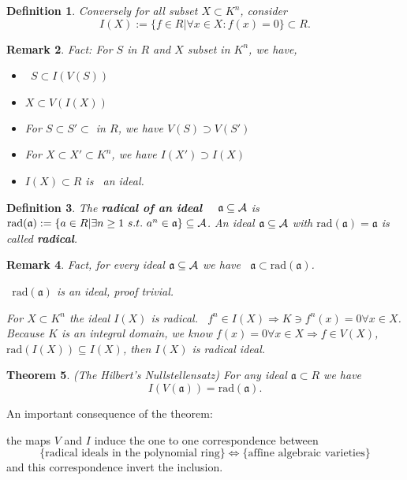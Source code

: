 \documentclass[11pt]{article}
\newtheorem{thm}{Theorem}[section]
\newtheorem{dfn}[thm]{Definition}
\newtheorem{rmk}[thm]{Remark}
\newcommand{\sca}{{\mathfrak a}}
\newcommand{\cala}{{\cal A}}
\newcommand{\Lrta}{\Longrightarrow}
\begin{document}
\begin{dfn}
Conversely for all subset $X \subset K^n$, consider 
          $$ I(X):=\{f\in R | \forall x\in X: f(x)=0\}\subset R.$$
\end{dfn}
\begin{rmk}
Fact: For $S$ in $R$ and $X$ subset in $K^n$, we have, 
\begin{itemize}
\item
 $S\subset I(V(S))$
\item
 $X \subset V(I(X))$
\item
 For $S\subset S' \subset$ in $R$, we have $V(S)\supset V(S')$
\item
 For $X \subset X'\subset K^n$, we have $ I(X')\supset I(X)$
\item
 $I(X) \subset R$ is  an ideal.
\end{itemize}
\end{rmk}

\begin{dfn}
The \textbf{radical of an ideal}   $\sca\subseteq \cala$ is 
 $\text{rad}(\sca):=\{a\in R| \exists n\geq1\  s.t.\  a^n \in \sca\} \subseteq \cala$.
An ideal $\sca \subseteq \cala$ with $\text{rad}(\sca)=\sca$ is  called \textbf{radical}.
\end{dfn}

\begin{rmk}
Fact, 
for every ideal $\sca \subseteq \cala$ we have  $\sca\subset \text{rad}(\sca)$.

 $\text{rad}(\sca)$ is an ideal, proof trivial.

For $X\subset K^n$ the ideal $I(X)$ is radical. 
$f^n\in I(X)\Lrta K\ni f^n(x)=0\forall x\in X$. Because $K$ is an integral domain, we know $f(x)=0\forall x\in X\Lrta f\in V(X)$, $\text{rad}(I(X))\subseteq I(X)$, then $I(X)$ is radical ideal.
\end{rmk}

\begin{thm}
(The Hilbert's Nullstellensatz)
For any ideal $\sca \subset R $ we have
$$I(V(\sca))=\text{rad}(\sca).$$
\end{thm}

An important consequence of the theorem:

the maps $V$ and $I$ induce the one to one correspondence between
$$
\{\text{radical ideals in the polynomial ring}\}\Longleftrightarrow                   \{\text{affine algebraic varieties}\}
$$
and this correspondence invert the inclusion.
\end{document}
